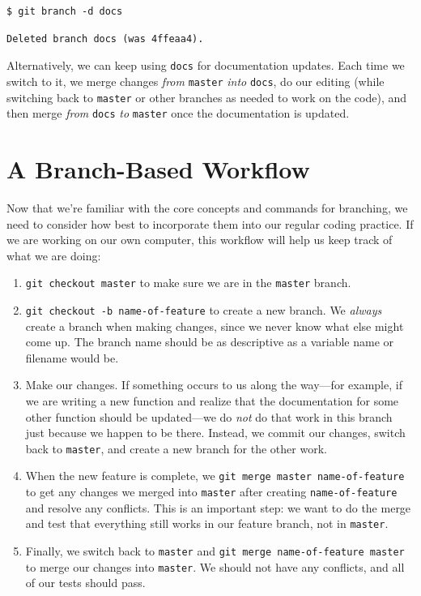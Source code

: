 \documentclass[
]{krantz}
\begin{document}
\begin{verbatim}
$ git branch -d docs
\end{verbatim}

\begin{verbatim}
Deleted branch docs (was 4ffeaa4).
\end{verbatim}

Alternatively,
we can keep using \texttt{docs} for documentation updates.
Each time we switch to it,
we merge changes \emph{from} \texttt{master} \emph{into} \texttt{docs},
do our editing
(while switching back to \texttt{master} or other branches as needed
to work on the code),
and then merge \emph{from} \texttt{docs} \emph{to} \texttt{master}
once the documentation is updated.

\hypertarget{git-advanced-workflow}{%
\section{A Branch-Based Workflow}\label{git-advanced-workflow}}

Now that we're familiar with the core concepts and commands for branching,
we need to consider how best to incorporate them into our regular coding practice.
If we are working on our own computer,
this workflow will help us keep track of what we are doing:

\begin{enumerate}
\def\labelenumi{\arabic{enumi}.}
\item
  \texttt{git\ checkout\ master} to make sure we are in the \texttt{master} branch.
\item
  \texttt{git\ checkout\ -b\ name-of-feature} to create a new branch.
  We \emph{always} create a branch when making changes,
  since we never know what else might come up.
  The branch name should be as descriptive as a variable name or filename would be.
\item
  Make our changes.
  If something occurs to us along the way---for example,
  if we are writing a new function and realize that
  the documentation for some other function should be updated---we do \emph{not}
  do that work in this branch just because we happen to be there.
  Instead,
  we commit our changes,
  switch back to \texttt{master},
  and create a new branch for the other work.
\item
  When the new feature is complete,
  we \texttt{git\ merge\ master\ name-of-feature}
  to get any changes we merged into \texttt{master} after creating \texttt{name-of-feature}
  and resolve any conflicts.
  This is an important step:
  we want to do the merge and test that everything still works in our feature branch,
  not in \texttt{master}.
\item
  Finally,
  we switch back to \texttt{master} and \texttt{git\ merge\ name-of-feature\ master}
  to merge our changes into \texttt{master}.
  We should not have any conflicts,
  and all of our tests should pass.
\end{enumerate}
\end{document}
